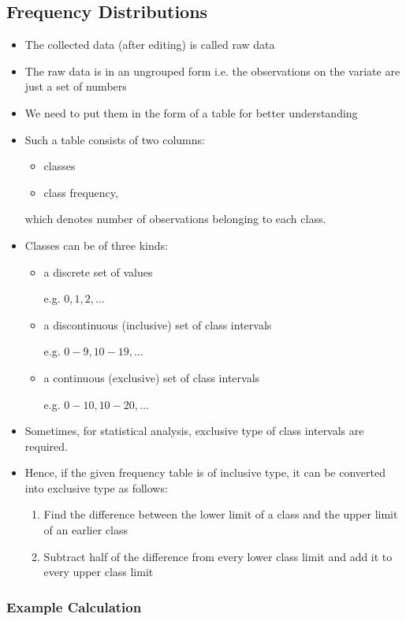 \documentclass[
10pt, %
a4paper, %
]{report}
\begin{document}
\subsection*{Frequency Distributions}
\begin{itemize}
\item The collected data (after editing) is
called raw data
\item The raw data is in an ungrouped form i.e. the observations on the variate are just a set of numbers
\item We need to put them in the form of a table for better understanding
\item Such a table consists of two columns:
\begin{itemize}
\item classes
\item class frequency,
\end{itemize}
which denotes number of observations belonging to
each class.
\item Classes can be of three kinds:
\begin{itemize}
\item a discrete set of values
\item[e.g.] \(0, 1, 2, \dots\)
\item a discontinuous (inclusive) set of class intervals
\item[e.g.] \(0-9, 10-19, \dots\)
\item a continuous (exclusive) set of class intervals
\item[e.g.] \(0-10, 10-20, \dots\)
\end{itemize}
\item Sometimes, for statistical analysis, exclusive type of class intervals are required.
\item Hence, if the given frequency table is of inclusive type, it can be converted into exclusive type as follows:
\begin{enumerate}
\item Find the difference between the lower limit of a class and the upper limit of an earlier class
\item Subtract half of the difference from every lower class limit and add it to every upper class limit
\end{enumerate}
\end{itemize}

\subsubsection*{Example Calculation}
\end{document}
